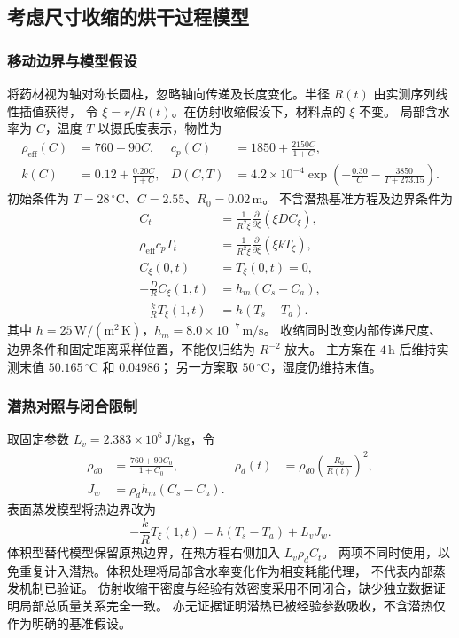 \subsection{考虑尺寸收缩的烘干过程模型}
\subsubsection{移动边界与模型假设}

将药材视为轴对称长圆柱，忽略轴向传递及长度变化。半径 $R(t)$ 由实测序列线性插值获得，
令 $\xi=r/R(t)$。在仿射收缩假设下，材料点的 $\xi$ 不变。
局部含水率为 $C$，温度 $T$ 以摄氏度表示，物性为
\begin{align}
\rho_{\mathrm{eff}}(C)&=760+90C,&
c_p(C)&=1850+\frac{2150C}{1+C},\\
k(C)&=0.12+\frac{0.20C}{1+C},&
D(C,T)&=4.2\times10^{-4}\exp\left(-\frac{0.30}{C}-\frac{3850}{T+273.15}\right).
\end{align}
初始条件为 $T=28\,^\circ\mathrm C$、$C=2.55$、$R_0=0.02\,\mathrm m$。
不含潜热基准方程及边界条件为
\begin{align}
C_t&=\frac{1}{R^2\xi}\frac{\partial}{\partial\xi}(\xi D C_\xi),\\
\rho_{\mathrm{eff}}c_pT_t&=\frac{1}{R^2\xi}\frac{\partial}{\partial\xi}(\xi k T_\xi),\\
C_\xi(0,t)&=T_\xi(0,t)=0,\\
-\frac{D}{R}C_\xi(1,t)&=h_m(C_s-C_a),\\
-\frac{k}{R}T_\xi(1,t)&=h(T_s-T_a).
\end{align}
其中 $h=25\,\mathrm{W/(m^2\,K)}$，$h_m=8.0\times10^{-7}\,\mathrm{m/s}$。
收缩同时改变内部传递尺度、边界条件和固定距离采样位置，不能仅归结为 $R^{-2}$ 放大。
主方案在 $4\,\mathrm h$ 后维持实测末值 $50.165\,^\circ\mathrm C$ 和 $0.04986$；
另一方案取 $50\,^\circ\mathrm C$，湿度仍维持末值。

\subsubsection{潜热对照与闭合限制}

取固定参数 $L_v=2.383\times10^6\,\mathrm{J/kg}$，令
\begin{align}
\rho_{d0}&=\frac{760+90C_0}{1+C_0},&
\rho_d(t)&=\rho_{d0}\left(\frac{R_0}{R(t)}\right)^2,\\
J_w&=\rho_dh_m(C_s-C_a).
\end{align}
表面蒸发模型将热边界改为
\begin{equation}
-\frac{k}{R}T_\xi(1,t)=h(T_s-T_a)+L_vJ_w.
\end{equation}
体积型替代模型保留原热边界，在热方程右侧加入 $L_v\rho_d C_t$。
两项不同时使用，以免重复计入潜热。体积处理将局部含水率变化作为相变耗能代理，
不代表内部蒸发机制已验证。
仿射收缩干密度与经验有效密度采用不同闭合，缺少独立数据证明局部总质量关系完全一致。
亦无证据证明潜热已被经验参数吸收，不含潜热仅作为明确的基准假设。

